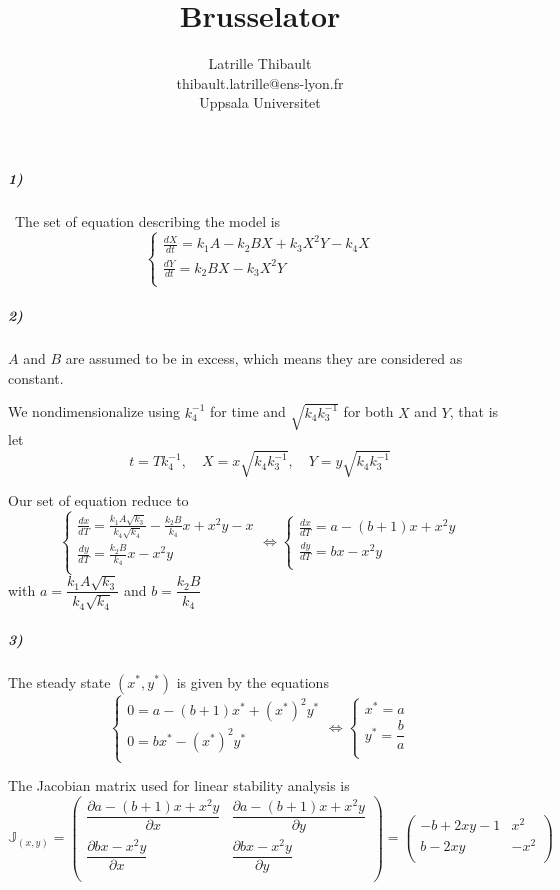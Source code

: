 \documentclass{article}
\author{Latrille Thibault\\
\small thibault.latrille@ens-lyon.fr\\[-0.8ex]
\small Uppsala Universitet\\}
\title{Brusselator}
\begin{document}
\maketitle
\renewcommand{\arraystretch}{1.5}

\subparagraph{1)}
\
The set of equation describing the model is 
$$ \displaystyle \left \{
    \begin{array}{l}
        \frac{dX}{dt}=k_1 A -k_2 B X  +k_3 X^2 Y -k_4 X \\
		\frac{dY}{dt}= k_2 B X -k_3 X^2 Y \\
    \end{array}
\right. $$

\subparagraph{2)}
$A$ and $B$ are assumed to be in excess, which means they are considered as constant. 

We nondimensionalize using $k_4^{-1}$ for time and $\sqrt{ k_4 k_3^{-1}}$ for both $X$ and $Y$, that is let  
$$ t = T k_4^{-1} , \quad X=x\sqrt{ k_4 k_3^{-1}}, \quad Y=y\sqrt{ k_4 k_3^{-1}}  $$

Our set of equation reduce to 
$$ \displaystyle \left \{
    \begin{array}{l}
        \frac{dx}{dT}=\frac{k_1 A\sqrt{k_3}}{k_4\sqrt{k_4}} - \frac{k_2 B}{k_4} x  +x^2 y -x  \\
		\frac{dy}{dT}= \frac{k_2 B}{k_4} x  -x^2 y\\
    \end{array}
    \right.
    \iff
    \left \{
    \begin{array}{l}
        \frac{dx}{dT}=a-(b+1)x +x^2 y \\
		\frac{dy}{dT}=bx -x^2 y \\
    \end{array}
\right. $$
with $a=\dfrac{k_1 A\sqrt{k_3}}{k_4\sqrt{k_4}}$ and $b=\dfrac{k_2 B}{k_4}$
\subparagraph{3)}
The steady state $(x^*,y^*)$ is given by the equations
$$ \displaystyle 
    \left \{
    \begin{array}{l}
        0=a-(b+1)x^* +(x^{*})^2 y^* \\
		0=bx^* -(x^{*})^2 y^* \\
    \end{array}
\right.
\iff
\left \{
    \begin{array}{l}
        x^*=a \\
		y^*=\dfrac{b}{a} \\
    \end{array}
\right.
 $$

The Jacobian matrix used for linear stability analysis is 
$$
\mathbb{J}_{(x,y)}=
\left(
\begin{array}{cc}
 \dfrac{\partial a-(b+1)x +x^2 y}{\partial x} & \dfrac{\partial a-(b+1)x +x^2 y}{\partial y} \\
\dfrac{\partial bx -x^2 y}{\partial x} & \dfrac{\partial bx -x^2 y}{\partial y} \\
\end{array}
\right)
=
\left(
\begin{array}{cc}
 -b+2 x y-1 & x^2 \\
 b-2 x y & -x^2 \\
\end{array}
\right)
$$
\end{document}
